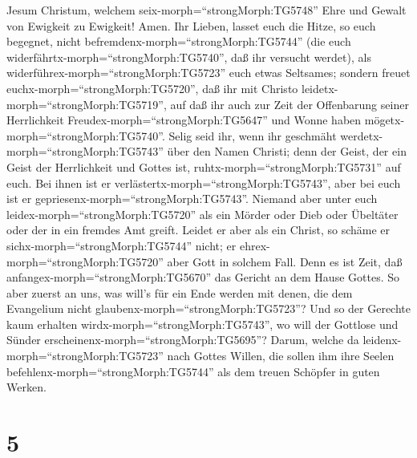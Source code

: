 Jesum Christum, welchem seix-morph=``strongMorph:TG5748'' Ehre und
Gewalt von Ewigkeit zu Ewigkeit! Amen.  Ihr Lieben, lasset
euch die Hitze, so euch begegnet, nicht
befremdenx-morph=``strongMorph:TG5744'' (die euch
widerfährtx-morph=``strongMorph:TG5740'', daß ihr versucht werdet), als
widerführex-morph=``strongMorph:TG5723'' euch etwas Seltsames;
 sondern freuet euchx-morph=``strongMorph:TG5720'', daß ihr
mit Christo leidetx-morph=``strongMorph:TG5719'', auf daß ihr auch zur
Zeit der Offenbarung seiner Herrlichkeit
Freudex-morph=``strongMorph:TG5647'' und Wonne haben
mögetx-morph=``strongMorph:TG5740''.  Selig seid ihr, wenn
ihr geschmäht werdetx-morph=``strongMorph:TG5743'' über den Namen
Christi; denn der Geist, der ein Geist der Herrlichkeit und Gottes ist,
ruhtx-morph=``strongMorph:TG5731'' auf euch. Bei ihnen ist er
verlästertx-morph=``strongMorph:TG5743'', aber bei euch ist er
gepriesenx-morph=``strongMorph:TG5743''.  Niemand aber
unter euch leidex-morph=``strongMorph:TG5720'' als ein Mörder oder Dieb
oder Übeltäter oder der in ein fremdes Amt greift.  Leidet
er aber als ein Christ, so schäme er sichx-morph=``strongMorph:TG5744''
nicht; er ehrex-morph=``strongMorph:TG5720'' aber Gott in solchem Fall.
 Denn es ist Zeit, daß
anfangex-morph=``strongMorph:TG5670'' das Gericht an dem Hause Gottes.
So aber zuerst an uns, was will's für ein Ende werden mit denen, die dem
Evangelium nicht glaubenx-morph=``strongMorph:TG5723''? 
Und so der Gerechte kaum erhalten wirdx-morph=``strongMorph:TG5743'', wo
will der Gottlose und Sünder erscheinenx-morph=``strongMorph:TG5695''?
 Darum, welche da leidenx-morph=``strongMorph:TG5723'' nach
Gottes Willen, die sollen ihm ihre Seelen
befehlenx-morph=``strongMorph:TG5744'' als dem treuen Schöpfer in guten
Werken.

\hypertarget{section-4}{%
\section{5}\label{section-4}}

